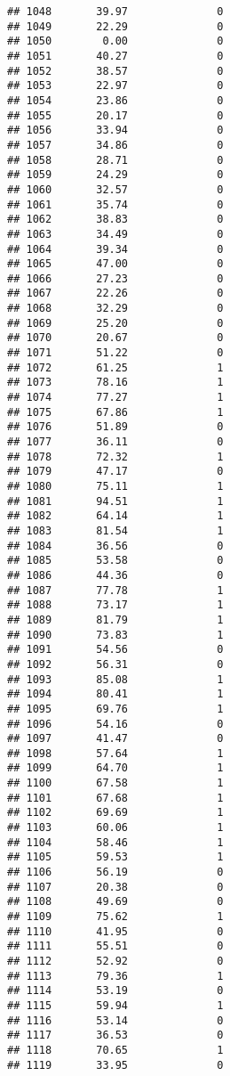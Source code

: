 \documentclass[
]{article}
\begin{document}
\begin{verbatim}
## 1048       39.97              0
## 1049       22.29              0
## 1050        0.00              0
## 1051       40.27              0
## 1052       38.57              0
## 1053       22.97              0
## 1054       23.86              0
## 1055       20.17              0
## 1056       33.94              0
## 1057       34.86              0
## 1058       28.71              0
## 1059       24.29              0
## 1060       32.57              0
## 1061       35.74              0
## 1062       38.83              0
## 1063       34.49              0
## 1064       39.34              0
## 1065       47.00              0
## 1066       27.23              0
## 1067       22.26              0
## 1068       32.29              0
## 1069       25.20              0
## 1070       20.67              0
## 1071       51.22              0
## 1072       61.25              1
## 1073       78.16              1
## 1074       77.27              1
## 1075       67.86              1
## 1076       51.89              0
## 1077       36.11              0
## 1078       72.32              1
## 1079       47.17              0
## 1080       75.11              1
## 1081       94.51              1
## 1082       64.14              1
## 1083       81.54              1
## 1084       36.56              0
## 1085       53.58              0
## 1086       44.36              0
## 1087       77.78              1
## 1088       73.17              1
## 1089       81.79              1
## 1090       73.83              1
## 1091       54.56              0
## 1092       56.31              0
## 1093       85.08              1
## 1094       80.41              1
## 1095       69.76              1
## 1096       54.16              0
## 1097       41.47              0
## 1098       57.64              1
## 1099       64.70              1
## 1100       67.58              1
## 1101       67.68              1
## 1102       69.69              1
## 1103       60.06              1
## 1104       58.46              1
## 1105       59.53              1
## 1106       56.19              0
## 1107       20.38              0
## 1108       49.69              0
## 1109       75.62              1
## 1110       41.95              0
## 1111       55.51              0
## 1112       52.92              0
## 1113       79.36              1
## 1114       53.19              0
## 1115       59.94              1
## 1116       53.14              0
## 1117       36.53              0
## 1118       70.65              1
## 1119       33.95              0
\end{verbatim}
\end{document}

